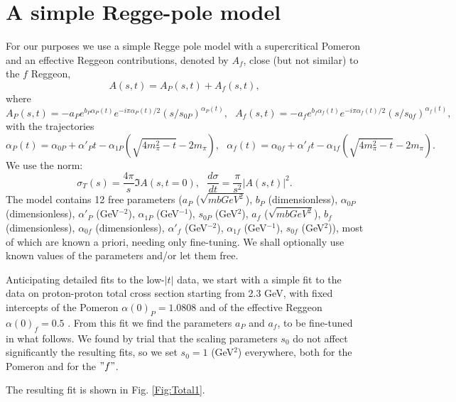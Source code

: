 \documentclass[aps,prd,superscriptaddress,showpacs,preprintnumbers]{revtex4}
\begin{document}
\section{A simple Regge-pole model}\label{Sec:Model}
For our purposes we use a simple Regge pole model with a supercritical Pomeron \cite{Landshoff} and an effective Reggeon contributions, denoted by $A_f$, close (but not similar) to the $f$ Reggeon, 
\begin{equation} \label{Eq:ampl}
A(s,t)=A_P(s,t)+A_f(s,t),
\end{equation} 
where
\begin{equation}\label{Eq:Pf}
A_P(s,t)=-a_Pe^{b_P\alpha_P(t)}e^{-i\pi\alpha_P(t)/2}(s/s_{0P})^{\alpha_P(t)}, \ \ \ A_f(s,t)=-a_fe^{b_f\alpha_f(t)}e^{-i\pi\alpha_f(t)/2}(s/s_{0f})^{\alpha_f(t)},
\end{equation}
with the trajectories
\begin{equation}\label{Eq:trajectory}
\alpha_P(t)=\alpha_{0P}+\alpha'_Pt-\alpha_{1P}(\sqrt{4m_{\pi}^2-t}-2m_{\pi}), \ \ \ \alpha_f(t)=\alpha_{0f}+\alpha'_ft-\alpha_{1f}(\sqrt{4m_{\pi}^2-t}-2m_{\pi}).
\end{equation}
We use the norm:
\begin{equation}
\sigma_T(s)=\frac{4\pi}{s}\Im A(s,t=0),\  \  \ \frac{d\sigma}{dt}=\frac{\pi}{s^2}|A(s,t)|^2.
\end{equation}
The model contains 12 free parameters ($a_P$ ($\sqrt{mbGeV^2}$), $b_P$ (dimensionless), $\alpha_{0P}$ (dimensionless), $\alpha'_P$ (GeV$^{-2}$), $\alpha_{1P}$ (GeV$^{-1}$), $s_{0P}$ (GeV$^2$), $a_f$ ($\sqrt{mbGeV^2}$), $b_f$ (dimensionless), $\alpha_{0f}$ (dimensionless), $\alpha'_f$ (GeV$^{-2}$), $\alpha_{1f}$ (GeV$^{-1}$),  $s_{0f}$ (GeV$^2$)), most of which are known a priori, needing only fine-tuning. We shall optionally use known values of the parameters and/or let them free.  

Anticipating detailed fits to the low-$|t|$ data, we start with a simple fit to the data on proton-proton total cross section starting from  2.3 GeV, with fixed intercepts of the Pomeron 
$\alpha(0)_P=1.0808$ and of the effective Reggeon $\alpha(0)_f=0.5$ \cite{Landshoff}. From this fit we find the parameters $a_P$ and $a_f$, to be fine-tuned in what follows. We found by trial that the scaling parameters $s_0$ do not affect significantly the resulting fits, so we set $s_0=1$ (GeV$^2$) everywhere, both for the Pomeron and for the $"f"$. 

The resulting fit is shown in Fig. \ref{Fig:Total1}.
 
\end{document}
